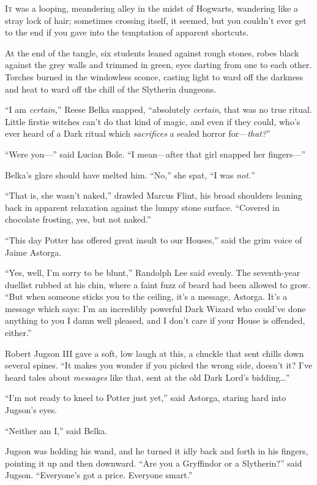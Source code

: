 
\lettrine{I}{t} was a looping, meandering alley in the midst of Hogwarts, wandering like a stray lock of hair; sometimes crossing itself, it seemed, but you couldn’t ever get to the end if you gave into the temptation of apparent shortcuts.

At the end of the tangle, six students leaned against rough stones, robes black against the grey walls and trimmed in green, eyes darting from one to each other. Torches burned in the windowless sconce, casting light to ward off the darkness and heat to ward off the chill of the Slytherin dungeons.

“I am \emph{certain,}” Reese Belka snapped, “absolutely \emph{certain}, that was no true ritual. Little firstie witches can’t do that kind of magic, and even if they could, who’s ever heard of a Dark ritual which \emph{sacrifices} a sealed horror for—\emph{that?}”

“Were you—” said Lucian Bole. “I mean—after that girl snapped her fingers—”

Belka’s glare should have melted him. “No,” she spat, “I was \emph{not.}”

“That is, she wasn’t naked,” drawled Marcus Flint, his broad shoulders leaning back in apparent relaxation against the lumpy stone surface. “Covered in chocolate frosting, yes, but not naked.”

“This day Potter has offered great insult to our Houses,” said the grim voice of Jaime Astorga.

“Yes, well, I’m sorry to be blunt,” Randolph Lee said evenly. The seventh-year duellist rubbed at his chin, where a faint fuzz of beard had been allowed to grow. “But when someone sticks you to the ceiling, it’s a message, Astorga. It’s a message which says: I’m an incredibly powerful Dark Wizard who could’ve done anything to you I damn well pleased, and I don’t care if your House is offended, either.”

Robert Jugson III gave a soft, low laugh at this, a chuckle that sent chills down several spines. “It makes you wonder if you picked the wrong side, doesn’t it? I’ve heard tales about \emph{messages} like that, sent at the old Dark Lord’s bidding…”

“I’m not ready to kneel to Potter just yet,” said Astorga, staring hard into Jugson’s eyes.

“Neither am I,” said Belka.

Jugson was holding his wand, and he turned it idly back and forth in his fingers, pointing it up and then downward. “Are you a Gryffindor or a Slytherin?” said Jugson. “Everyone’s got a price. Everyone smart.”


